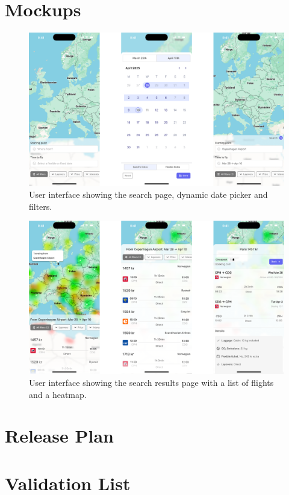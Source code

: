 \documentclass[a4paper]{article}
\begin{document}
\section{Mockups}
\begin{figure}[h]
\includegraphics[width=1\textwidth]{resources/mockup1.png}
\caption{User interface showing the search page, dynamic date picker and filters.}
\end{figure}

\begin{figure}[h]
\includegraphics[width=1\textwidth]{resources/mockup2.png}
\caption{User interface showing the search results page with a list of flights and a heatmap.}
\end{figure}



\section{Release Plan}


\section{Validation List}

\end{document}
